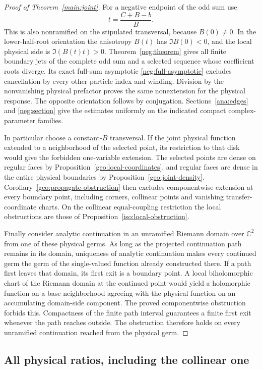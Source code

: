 \documentclass[11pt]{article}
\numberwithin{equation}{section}
\theoremstyle{definition}
\newcommand{\C}{\mathbb C}
\begin{document}
\begin{proof}[Proof of Theorem~\ref{main:joint}]
For a negative endpoint of the odd sum use
\[
             t=\frac{C+B-b}{B}.
\]
This is also nonramified on the stipulated transversal, because
\(B(0)\ne0\). In the lower-half-root orientation the anisotropy
\(B(t)\) has \(\Im B(0)<0\), and the local physical side is
\(\Im(B(t)t)>0\). Theorem~\ref{neg:theorem} gives all finite
boundary jets of the complete odd sum and a selected sequence
whose coefficient roots diverge. Its exact full-sum asymptotic
\eqref{neg:full-asymptotic} excludes cancellation by every other
particle index and winding. Division by the nonvanishing physical
prefactor proves the same nonextension for the physical response.
The opposite orientation follows by conjugation.
Sections~\ref{ana:edges} and \ref{neg:section} give the estimates
uniformly on the indicated compact complex-parameter families.

In particular choose a constant-\(B\) transversal. If the joint
physical function extended to a neighborhood of the selected point,
its restriction to that disk would give the forbidden one-variable
extension. The selected points are dense
on regular faces by Proposition~\ref{geo:local-coordinates}, and
regular faces are dense in the entire physical boundaries by
Proposition~\ref{geo:joint-density}. Corollary~\ref{geo:propagate-obstruction}
then excludes componentwise extension at every boundary point,
including corners, collinear points and vanishing transfer-coordinate
charts. On the collinear equal-coupling restriction the local
obstructions are those of Proposition~\ref{iso:local-obstruction}.

Finally consider analytic continuation in an unramified Riemann domain
over \(\C^2\) from one of these physical germs. As long as the
projected continuation path remains in its domain, uniqueness of
analytic continuation makes every continued germ the germ of the
single-valued function already constructed there. If a path first
leaves that domain, its first exit is a boundary point. A local
biholomorphic chart of the Riemann domain at the continued point
would yield a holomorphic function on a base neighborhood agreeing
with the physical function on an accumulating domain-side component.
The proved componentwise obstruction forbids this. Compactness of
the finite path interval guarantees a finite first exit whenever the
path reaches outside. The obstruction therefore holds on every
unramified continuation reached from the physical germ.
\end{proof}

\subsection{All physical ratios, including the collinear one}
\end{document}
